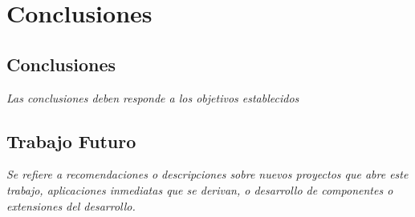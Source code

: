 \chapter{Conclusiones}
\label{ch:conclusions}

\newpage

\section{Conclusiones}

\textit{Las conclusiones deben responde a los objetivos establecidos}


\section{Trabajo Futuro}

\textit{Se refiere a recomendaciones o descripciones sobre nuevos proyectos que abre este trabajo, aplicaciones inmediatas que se derivan, o desarrollo de componentes o extensiones del desarrollo.}